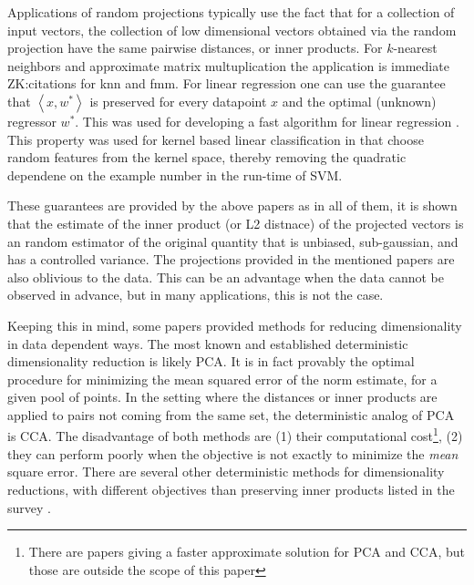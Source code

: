 \documentclass{article}
\theoremstyle{definition}
\theoremstyle{plain}
\newcommand{\ip}[1]{\left \langle #1 \right \rangle}
\newcommand{\zk}[1]{{\color{blue}ZK:#1}}
\begin{document}
Applications of random projections typically use the fact that for a collection of input vectors, the collection of low dimensional vectors obtained via the random projection have the same pairwise distances, or inner products. For $k$-nearest neighbors and approximate matrix multuplication the application is immediate \zk{citations for knn and fmm}. For linear regression one can use the guarantee that $\ip{x,w^*}$ is preserved for every datapoint $x$ and the optimal (unknown) regressor $w^*$. This was used for developing a fast algorithm for linear regression \cite{fradkin2003experiments, maillard2012linear}. This property was used for kernel based linear classification in \cite{rahimi2008random} that choose random features from the kernel space, thereby removing the quadratic dependene on the example number in the run-time of SVM.


These guarantees are provided by the above papers as in all of them, it is shown that the estimate of the inner product (or L2 distnace) of the projected vectors is an random estimator of the original quantity that is unbiased, sub-gaussian, and has a controlled variance. The projections provided in the mentioned papers are also oblivious to the data. This can be an advantage when the data cannot be observed in advance, but in many applications, this is not the case. 

Keeping this in mind, some papers provided methods for reducing dimensionality in data dependent ways. The most known and established deterministic dimensionality reduction is likely PCA. It is in fact provably the optimal procedure for minimizing the mean squared error of the norm estimate, for a given pool of points. In the setting where the distances or inner products are applied to pairs not coming from the same set, the deterministic analog of PCA is CCA. The disadvantage of both methods are (1) their computational cost\footnote{There are papers giving a faster approximate solution for PCA and CCA, but those are outside the scope of this paper}, (2) they can perform poorly when the objective is not exactly to minimize the \emph{mean} square error. There are several other deterministic methods for dimensionality reductions, with different objectives than preserving inner products listed in the survey \cite{cunningham2015linear}.
\end{document}
